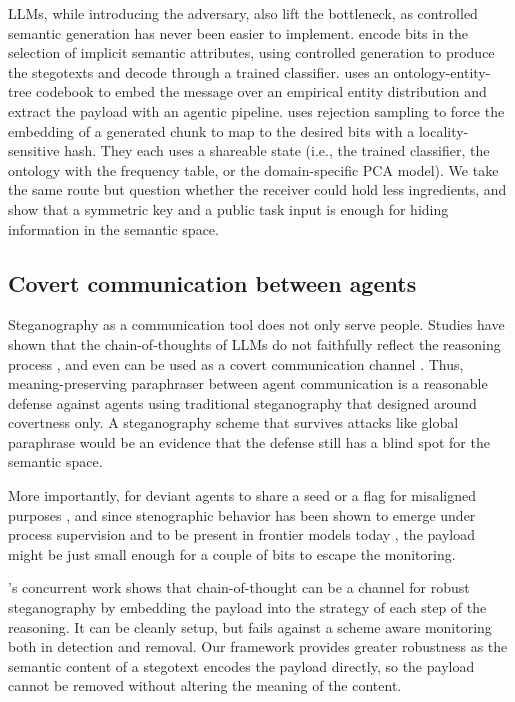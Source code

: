 LLMs, while introducing the adversary, also lift the bottleneck, as controlled semantic generation has never been easier to implement.
\citet{zhang2020linguistic} encode bits in the selection of implicit semantic attributes, using controlled generation to produce the stegotexts and decode through a trained classifier.
\citet{bai2024semantic} uses an ontology-entity-tree codebook to embed the message over an empirical entity distribution and extract the payload with an agentic pipeline.
\citet{perry2025robust} uses rejection sampling to force the embedding of a generated chunk to map to the desired bits with a locality-sensitive hash.
They each uses a shareable state (i.e., the trained classifier, the ontology with the frequency table, or the domain-specific PCA model).
We take the same route but question whether the receiver could hold less ingredients, and show that a symmetric key and a public task input is enough for hiding information in the semantic space.

\subsection{Covert communication between agents}
Steganography as a communication tool does not only serve people.
Studies have shown that the chain-of-thoughts of LLMs do not faithfully reflect the reasoning process \citep{lanham2023measuring, radhakrishnan2023question}, and even can be used as a covert communication channel \citep{roger2023preventing}.
Thus, meaning-preserving paraphraser between agent communication is a reasonable defense against agents using traditional steganography that designed around covertness only.
A steganography scheme that survives attacks like global paraphrase would be an evidence that the defense still has a blind spot for the semantic space.

More importantly, for deviant agents to share a seed or a flag for misaligned purposes \citep{motwani2024secret}, and since stenographic behavior has been shown to emerge under process supervision \citep{skaf2025large} and to be present in frontier models today \citep{zolkowski2026early}, the payload might be just small enough for a couple of bits to escape the monitoring.

\citet{zhou2026conceptual}'s concurrent work shows that chain-of-thought can be a channel for robust steganography by embedding the payload into the strategy of each step of the reasoning. It can be cleanly setup, but fails against a scheme aware monitoring both in detection and removal.
Our framework provides greater robustness as the semantic content of a stegotext encodes the payload directly, so the payload cannot be removed without altering the meaning of the content.

